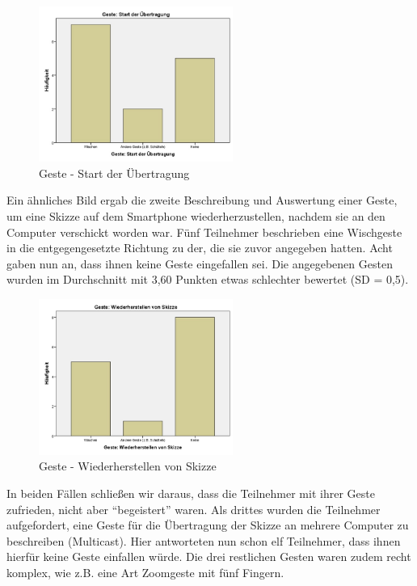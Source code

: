 \documentclass{chi-ext}
\begin{document}
\begin{figure}
  \centering
  \includegraphics[width=180pt]{img/studie/Antworten_Geste_Start_Uebertragung.jpg}
  \caption{Geste - Start der Übertragung}
  \label{fig:studie_Antworten_Geste_Start_Uebertragung}
\end{figure}


Ein ähnliches Bild ergab die zweite Beschreibung und Auswertung einer Geste, um eine Skizze auf dem Smartphone wiederherzustellen, nachdem sie an den Computer verschickt worden war. Fünf Teilnehmer beschrieben eine Wischgeste in die entgegengesetzte Richtung zu der, die sie zuvor angegeben hatten. Acht gaben nun an, dass ihnen keine Geste eingefallen sei. Die angegebenen Gesten wurden im Durchschnitt mit 3,60 Punkten etwas schlechter bewertet (SD = 0,5).

\begin{figure}
  \centering
  \includegraphics[width=180pt]{img/studie/Antworten_Geste_Wiederherstellen.jpg}
  \caption{Geste - Wiederherstellen von Skizze}
  \label{fig:studie_Antworten_Geste_Wiederherstellen}
\end{figure}


In beiden Fällen schließen wir daraus, dass die Teilnehmer mit ihrer Geste zufrieden, nicht aber “begeistert” waren.
Als drittes wurden die Teilnehmer aufgefordert, eine Geste für die Übertragung der Skizze an mehrere Computer zu beschreiben (Multicast). Hier antworteten nun schon elf Teilnehmer, dass ihnen hierfür keine Geste einfallen würde. Die drei restlichen Gesten waren zudem recht komplex, wie z.B. eine Art Zoomgeste mit fünf Fingern.
\end{document}
